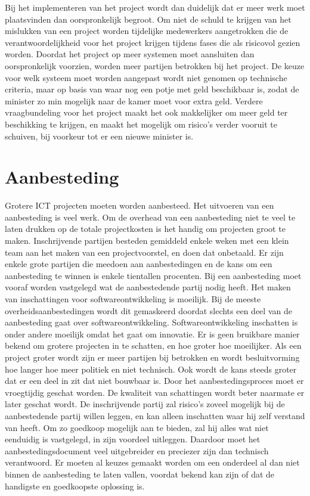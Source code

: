 \documentclass[10pt]{article}   	%
\begin{document}
\begin{multicols}{2}
Bij het implementeren van het project wordt dan duidelijk dat er meer werk moet plaatsvinden dan oorspronkelijk
begroot. Om niet de schuld te krijgen van het mislukken van een project worden tijdelijke medewerkers aangetrokken
die de verantwoordelijkheid voor het project krijgen tijdens fases die als risicovol gezien worden. Doordat het
project op meer systemen moet aansluiten dan oorspronkelijk voorzien, worden meer partijen betrokken 
bij het project. De keuze voor welk systeem moet worden aangepast wordt niet genomen op technische criteria,
maar op basis van waar nog een potje met geld beschikbaar is, zodat de minister zo min mogelijk naar de
kamer moet voor extra geld. Verdere vraagbundeling voor het project maakt het ook makkelijker om meer geld 
ter beschikking te krijgen, en maakt het mogelijk om risico's verder vooruit te schuiven, bij voorkeur tot er 
een nieuwe minister is.


\section{Aanbesteding}

Grotere ICT projecten moeten worden aanbesteed. Het uitvoeren van een aanbesteding is veel werk.
Om de overhead van een aanbesteding niet te veel te laten drukken op de totale projectkosten is
het handig om projecten groot te maken. Inschrijvende partijen besteden gemiddeld enkele weken 
met een klein team aan het maken van een projectvoorstel, en doen dat onbetaald. Er zijn enkele
grote partijen die meedoen aan aanbestedingen en de kans om een aanbesteding te winnen is
enkele tientallen procenten. Bij een aanbesteding moet vooraf worden vastgelegd wat de aanbestedende
partij nodig heeft. Het maken van inschattingen voor softwareontwikkeling is moeilijk. Bij de meeste
overheidsaanbestedingen wordt dit gemaskeerd doordat slechts een deel van de aanbesteding 
gaat over softwareontwikkeling. Softwareontwikkeling inschatten is onder andere moeilijk
omdat het gaat om innovatie. Er is geen bruikbare manier bekend om grotere projecten in te schatten,
en hoe groter hoe moeilijker. Als een project groter wordt zijn er meer partijen bij betrokken en
wordt besluitvorming hoe langer hoe meer politiek en niet technisch. Ook wordt de kans steeds groter 
dat er een deel in zit dat niet bouwbaar is.  Door het aanbestedingsproces moet er vroegtijdig 
geschat worden. De kwaliteit van schattingen wordt beter naarmate er later geschat wordt. 
De inschrijvende partij zal risico's zoveel mogelijk bij de aanbestedende partij willen leggen,
en kan alleen inschatten waar hij zelf verstand van heeft. Om zo goedkoop mogelijk aan te bieden, 
zal hij alles wat niet eenduidig is vastgelegd, in zijn voordeel uitleggen. Daardoor moet het
aanbestedingsdocument veel uitgebreider en preciezer zijn dan technisch verantwoord. 
Er moeten al keuzes gemaakt worden om een onderdeel al dan niet binnen de aanbesteding te
laten vallen, voordat bekend kan zijn of dat de handigste en goedkoopste oplossing is. 



\end{multicols}
\end{document}
